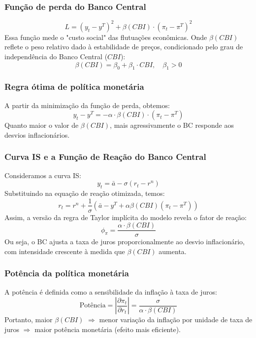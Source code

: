 \documentclass[a4paper,12pt]{article}[abnt2]
\begin{document}
\subsubsection{\textbf{Função de perda do Banco Central}}
\begin{equation}
L = (y_t - y^T)^2 + \beta(CBI) \cdot (\pi_t - \pi^T)^2
\end{equation}
\noindent Essa função mede o "custo social" das flutuações econômicas. Onde $\beta(CBI)$ reflete o peso relativo dado à estabilidade de preços, condicionado pelo grau de independência do Banco Central ($CBI$):
\begin{equation}
\beta(CBI) = \beta_0 + \beta_1 \cdot CBI, \quad \beta_1 > 0
\end{equation}

\subsubsection{\textbf{Regra ótima de política monetária}}
A partir da minimização da função de perda, obtemos:
\begin{equation}
y_t - y^T = - \alpha \cdot \beta(CBI) \cdot (\pi_t - \pi^T)
\end{equation}
\noindent  Quanto maior o valor de $\beta(CBI)$, mais agressivamente o BC responde aos desvios inflacionários.

\subsubsection{\textbf{Curva IS e a Função de Reação do Banco Central}}
Consideramos a curva IS:
\begin{equation}
y_t = \bar{a} - \sigma (r_t - r^n)
\end{equation}
\noindent Substituindo na equação de reação otimizada, temos:
\begin{equation}
r_t = r^n + \frac{1}{\sigma}(\bar{a} - y^T + \alpha \beta(CBI)(\pi_t - \pi^T))
\end{equation}
\noindent Assim, a versão da regra de Taylor implícita do modelo revela o fator de reação:
\begin{equation}
\phi_\pi = \frac{\alpha \cdot \beta(CBI)}{\sigma}
\end{equation}
\noindent Ou seja, o BC ajusta a taxa de juros proporcionalmente ao desvio inflacionário, com intensidade crescente à medida que $\beta(CBI)$ aumenta.

\subsubsection{\textbf{Potência da política monetária}}
A potência é definida como a sensibilidade da inflação à taxa de juros:
\begin{equation}
\text{Potência} = \left| \frac{\partial \pi_t}{\partial r_t} \right| = \frac{\sigma}{\alpha \cdot \beta(CBI)}
\end{equation}
\noindent Portanto, maior $\beta(CBI)$ $\Rightarrow$ menor variação da inflação por unidade de taxa de juros $\Rightarrow$ maior potência monetária (efeito mais eficiente).
\end{document}

